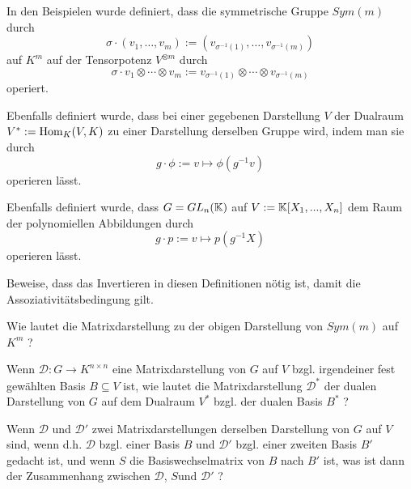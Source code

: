\begin{sheet}

\begin{problem}[title={Komische Minus Einsen}, difficulty=leicht]\label{ex:invertieren_fuer_linksmoduln}
\begin{subproblem}
In den Beispielen wurde definiert, dass die symmetrische Gruppe $Sym(m)$ durch
\[\sigma \cdot (v_1,\ldots,v_m) := (v_{\sigma^{-1}(1)}, \ldots, v_{\sigma^{-1}(m)})\]
auf $K^m$ auf der Tensorpotenz $V^{\otimes m}$ durch
\[\sigma \cdot v_1\otimes\cdots\otimes v_m := v_{\sigma^{-1}(1)}\otimes \cdots \otimes v_{\sigma^{-1}(m)} \]
operiert.
\end{subproblem}
\begin{subproblem}
Ebenfalls definiert wurde, dass bei einer gegebenen Darstellung $V$ der Dualraum $V^\ast := \operatorname{Hom}_K(V,K)$ zu einer Darstellung derselben Gruppe wird, indem man sie durch
\[g\cdot \phi := v\mapsto \phi(g^{-1}v)\]
operieren lässt.
\end{subproblem}
\begin{subproblem}
Ebenfalls definiert wurde, dass $G=GL_n(\mathbb{K})$ auf $V:=\mathbb{K}[X_1, ..., X_n]$ dem Raum der polynomiellen Abbildungen durch
\[g\cdot p := v\mapsto p(g^{-1}X)\]
operieren lässt.
\end{subproblem}

Beweise, dass das Invertieren in diesen Definitionen nötig ist, damit die Assoziativitätsbedingung gilt.
\end{problem}

\begin{problem}
Wie lautet die Matrixdarstellung zu der obigen Darstellung von $Sym(m)$ auf $K^m$ ?
\end{problem}

\begin{problem}
Wenn $\mathcal{D}: G\to K^{n\times n}$ eine Matrixdarstellung von $G$ auf $V$ bzgl. irgendeiner fest gewählten Basis $B\subseteq V$ ist, wie lautet die Matrixdarstellung $\mathcal{D}^\ast$ der dualen Darstellung von $G$ auf dem Dualraum $V^\ast$ bzgl. der dualen Basis $B^\ast$ ?
\end{problem}

\begin{problem}[title={Basiswechsel}]
Wenn $\mathcal{D}$ und $\mathcal{D}'$ zwei Matrixdarstellungen derselben Darstellung von $G$ auf $V$ sind, wenn d.h. $\mathcal{D}$ bzgl. einer Basis $B$ und $\mathcal{D}'$ bzgl. einer zweiten Basis $B'$ gedacht ist, und wenn $S$ die Basiswechselmatrix von $B$ nach $B'$ ist, was ist dann der Zusammenhang zwischen $\mathcal{D}$, $S$und $\mathcal{D}'$ ?
\end{problem}


\end{sheet}
